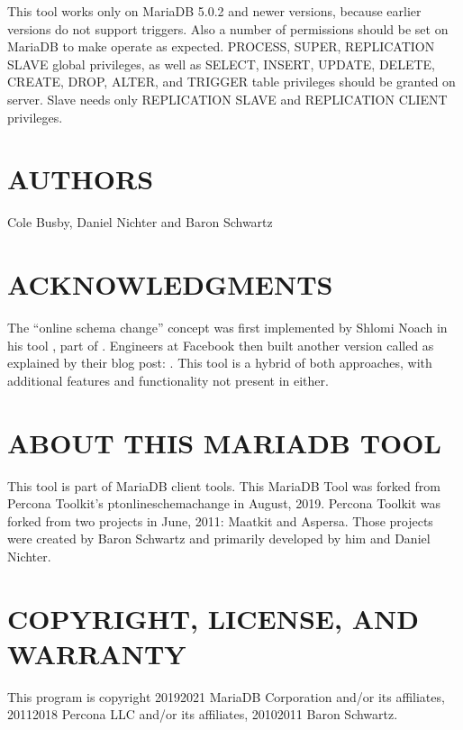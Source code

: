 \documentclass[letterpaper,10pt,english]{sphinxmanual}
\begin{document}
This tool works only on MariaDB 5.0.2 and newer versions, because earlier versions
do not support triggers. Also a number of permissions should be set on MariaDB
to make  operate as expected. PROCESS, SUPER, REPLICATION SLAVE
global privileges, as well as SELECT, INSERT, UPDATE, DELETE, CREATE, DROP, ALTER,
and TRIGGER table privileges should be granted on server. Slave needs only
REPLICATION SLAVE and REPLICATION CLIENT privileges.


\section{AUTHORS}
\label{\detokenize{mariadb-schema-change:authors}}
Cole Busby, Daniel Nichter and Baron Schwartz


\section{ACKNOWLEDGMENTS}
\label{\detokenize{mariadb-schema-change:acknowledgments}}
The “online schema change” concept was first implemented by Shlomi Noach
in his tool , part of
.  Engineers at Facebook then built
another version called  as explained by their blog
post: . This tool is a hybrid of both approaches,
with additional features and functionality not present in either.


\section{ABOUT THIS MARIADB TOOL}
\label{\detokenize{mariadb-schema-change:about-this-mariadb-tool}}
This tool is part of MariaDB client tools. This MariaDB Tool was forked from
Percona Toolkit’s pt\sphinxhyphen{}online\sphinxhyphen{}schema\sphinxhyphen{}change in August, 2019. Percona Toolkit was
forked from two projects in June, 2011: Maatkit and Aspersa.  Those projects
were created by Baron Schwartz and primarily developed by him and Daniel Nichter.


\section{COPYRIGHT, LICENSE, AND WARRANTY}
\label{\detokenize{mariadb-schema-change:copyright-license-and-warranty}}
This program is copyright 2019\sphinxhyphen{}2021 MariaDB Corporation and/or its affiliates,
2011\sphinxhyphen{}2018 Percona LLC and/or its affiliates, 2010\sphinxhyphen{}2011 Baron Schwartz.
\end{document}
